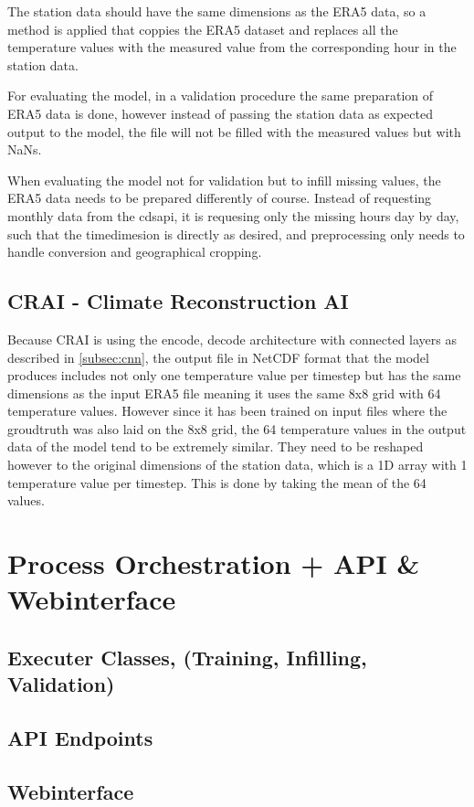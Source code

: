 The station data should have the same dimensions as the ERA5 data, so a method is applied that coppies the ERA5 dataset and replaces all the temperature values with the measured value from the corresponding hour in the station data.

For evaluating the model, in a validation procedure the same preparation of ERA5 data is done, however instead of passing the station data as expected output to the model, the file will not be filled with the measured values but with NaNs.

When evaluating the model not for validation but to infill missing values, the ERA5 data needs to be prepared differently of course. Instead of requesting monthly data from the cdsapi, it is requesing only the missing hours day by day, such that the timedimesion is directly as desired, and preprocessing only needs to handle conversion and geographical cropping.

\subsection{CRAI - Climate Reconstruction AI}

Because CRAI is using the encode, decode architecture with connected layers as described in \autoref{subsec:cnn}, the output file in NetCDF format that the model produces includes not only one temperature value per timestep but has the same dimensions as the input ERA5 file meaning it uses the same 8x8 grid with 64 temperature values. However since it has been trained on input files where the groudtruth was also laid on the 8x8 grid, the 64 temperature values in the output data of the model tend to be extremely similar. They need to be reshaped however to the original dimensions of the station data, which is a 1D array with 1 temperature value per timestep. This is done by taking the mean of the 64 values. 

\section{Process Orchestration + API \& Webinterface}

\subsection{Executer Classes, (Training, Infilling, Validation)}

\subsection{API Endpoints}

\subsection{Webinterface}

